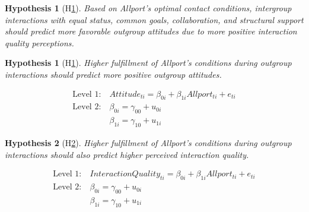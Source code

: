 \documentclass[man, 12pt, a4paper, mask]{apa7}
\theoremstyle{break}
\theoremstyle{plain}
\newtheorem{hyp}{Hypothesis}
\newtheorem{subhyp}{Hypothesis}
\begin{document}
\begin{mdframed}[style=mdfhypothesis]
    \begin{hyp}[H\ref{hyp:Allport}] \label{hyp:Allport}
    Based on Allport's optimal contact conditions, intergroup interactions with equal status, common goals, collaboration, and structural support should predict more favorable outgroup attitudes due to more positive interaction quality perceptions.
    \end{hyp}

    \setcounter{subhyp}{0}
    \begin{subhyp}[H\ref{hyp:AttAllport}] \label{hyp:AttAllport}
    \addtolength{\leftskip}{\subhypskip}
    Higher fulfillment of Allport's conditions during outgroup interactions should predict more positive outgroup attitudes.
    \end{subhyp}

    \begin{fleqn}[\eqskip]
      \begin{equation} \label{eq:SlopesAttAllport}
        \begin{split}
            \textrm{Level 1:} &\ Attitude_{ti} = \beta_{0i} + \beta_{1i}Allport_{ti} + e_{ti}\\
            \textrm{Level 2:} &\ \beta_{0i} = \gamma_{00} + u_{0i} \\
                              &\ \beta_{1i} = \gamma_{10} + u_{1i}
        \end{split}
      \end{equation}
    \end{fleqn}

    \begin{subhyp}[H\ref{hyp:QltAllport}] \label{hyp:QltAllport}
    \addtolength{\leftskip}{\subhypskip}
    Higher fulfillment of Allport's conditions during outgroup interactions should also predict higher perceived interaction quality.
    \end{subhyp}

    \begin{fleqn}[\eqskip]
      \begin{equation} \label{eq:SlopesQltAllport}
        \begin{split}
            \textrm{Level 1:} &\ InteractionQuality_{ti} = \beta_{0i} + \beta_{1i}Allport_{ti} + e_{ti}\\
            \textrm{Level 2:} &\ \beta_{0i} = \gamma_{00} + u_{0i} \\
                              &\ \beta_{1i} = \gamma_{10} + u_{1i}
        \end{split}
      \end{equation}
    \end{fleqn}


\end{mdframed}
\end{document}
